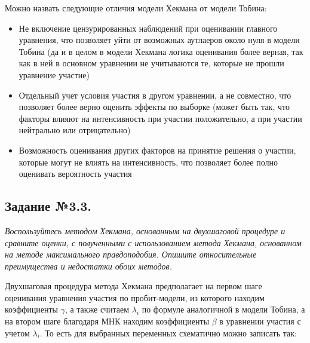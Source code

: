 \documentclass[a4paper,12pt]{article}
\begin{document}
\vspace{0.2cm}

Можно назвать следующие отличия модели Хекмана от модели Тобина:

\begin{itemize}
	\item Не включение цензурированных наблюдений при оценивании главного уравнения, что позволяет уйти от возможных аутлаеров около нуля в модели Тобина (да и в целом в модели Хекмана логика оценивания более верная, так как в ней в основном уравнении не учитываются те, которые не прошли уравнение участие)
	
	\item Отдельный учет условия участия в другом уравнении, а не совместно, что позволяет более верно оценить эффекты по выборке (может быть так, что факторы влияют на интенсивность при участии положительно, а при участии нейтрально или отрицательно)
	
	\item Возможность оценивания других факторов на принятие решения о участии, которые могут не влиять на интенсивность, что позволяет более полно оценивать вероятность участия
	
\end{itemize}


\subsection{Задание №3.3.} 
\textit{Воспользуйтесь методом Хекмана, основанным на двухшаговой процедуре и
сравните оценки, с полученными с использованием метода Хекмана, основанном на методе
максимального правдоподобия. Опишите относительные преимущества и недостатки
обоих методов.}

\vspace{0.2cm}

Двухшаговая процедура метода Хекмана предполагает на первом шаге оценивания уравнения участия по пробит-модели, из которого находим коэффициенты $\gamma$, а также считаем $\lambda_i$ по формуле аналогичной в модели Тобина, а на втором шаге благодаря МНК находим коэффициенты $\beta$ в уравнении участия с учетом $\lambda_i$. То есть для выбранных переменных схематично можно записать так:
\end{document}
